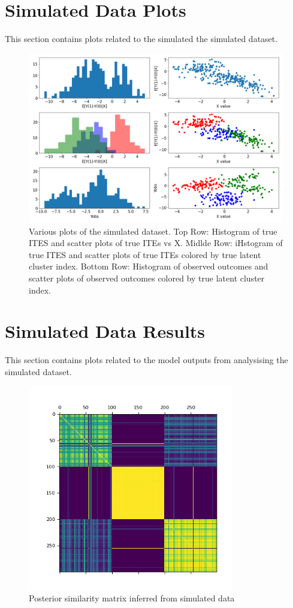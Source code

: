 \documentclass{article}
\begin{document}
\section{Simulated Data Plots}
This section contains plots related to the simulated the simulated dataset.
\begin{figure}[h]
  \centering
  \includegraphics[width=1\textwidth]{Plots/simulated_data_info.png}
  \caption{Various plots of the simulated dataset. Top Row: Histogram of true ITES and scatter plots of true ITEs vs X. Midlde Row: iHstogram of true ITES and scatter plots of true ITEs colored by true latent cluster index. Bottom Row: Histogram of observed outcomes and scatter plots of observed outcomes colored by true latent cluster index.}
  \label{fig:sim_data_info}
\end{figure}

\section{Simulated Data Results}
This section contains plots related to the model outputs from analysising the simulated dataset.
\begin{figure}[H]
  \centering
  \includegraphics[width=0.8\textwidth]{Plots/Simulated Posterior Similarity Matrix.png}
  \caption{Posterior similarity matrix inferred from simulated data}
  \label{fig:sim_post_mat}
\end{figure}
\end{document}
